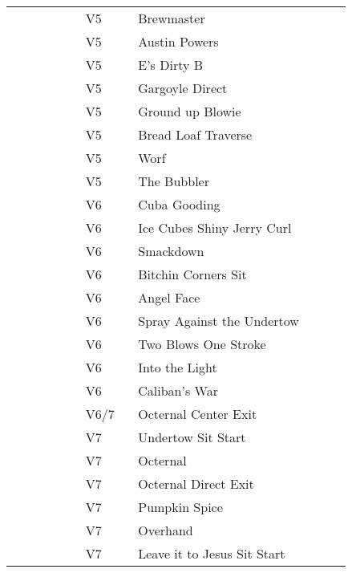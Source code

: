 \begin{flushleft}
\begin{center}
\begin{supertabular}{p{0.18\linewidth}p{0.13\linewidth}p{0.45\linewidth}p{0.08\linewidth}}
  &V5&Brewmaster & \pageref{rt:Brewmaster} \\
  &V5&Austin Powers & \pageref{rt:Austin Powers} \\
  &V5&E's Dirty B & \pageref{rt:E's Dirty B} \\
  &V5&Gargoyle Direct & \pageref{vr:Gargoyle Direct} \\
  &V5&Ground up Blowie & \pageref{rt:Ground up Blowie} \\
  &V5&Bread Loaf Traverse & \pageref{rt:Bread Loaf Traverse} \\
  &V5&Worf & \pageref{rt:Worf} \\
&V5&The Bubbler & \pageref{rt:The Bubbler} \\
  &V6&Cuba Gooding & \pageref{rt:Cuba Gooding} \\
  &V6&Ice Cubes Shiny Jerry Curl & \pageref{rt:Ice Cubes Shiny Jerry Curl} \\
  &V6&Smackdown & \pageref{rt:Smackdown} \\
  &V6&Bitchin Corners Sit & \pageref{vr:Bitchin Corners Sit} \\
&V6&Angel Face & \pageref{rt:Angel Face} \\
&V6&Spray Against the Undertow & \pageref{vr:Spray Against the Undertow} \\
&V6&Two Blows One Stroke & \pageref{rt:Two Blows One Stroke} \\
&V6&Into the Light & \pageref{rt:Into the Light} \\
&V6&Caliban's War & \pageref{rt:Caliban's War} \\
  &V6/7&Octernal Center Exit & \pageref{vr:Octernal Center Exit} \\
   &V7&Undertow Sit Start & \pageref{vr:Undertow Sit Start} \\
   &V7&Octernal & \pageref{rt:Octernal} \\
   &V7&Octernal Direct Exit & \pageref{vr:Octernal Direct Exit} \\
  &V7&Pumpkin Spice & \pageref{rt:Pumpkin Spice} \\
&V7&Overhand & \pageref{rt:Overhand} \\
&V7&Leave it to Jesus Sit Start & \pageref{vr:Leave it to Jesus Sit Start} \\

\end{supertabular}
\end{center}
\end{flushleft}
